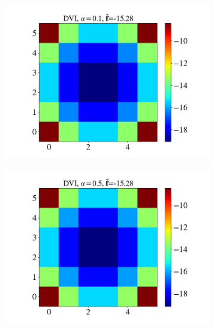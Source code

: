 \begin{itemize}
\begin{figure}[H]
\begin{subfigure}{0.32\columnwidth}
			\includegraphics[width=1.0\textwidth]{images/CD/Example7/5/N_6_DVI_0.1.png}
		\end{subfigure}
		\begin{subfigure}{0.32\columnwidth}	
			\centering
			\includegraphics[width=1.0\textwidth]{images/CD/Example7/5/N_6_DVI_0.5.png}
		\end{subfigure}
		\begin{subfigure}{0.32\columnwidth}	
			\centering

\end{subfigure}
\end{figure}
\end{itemize}
